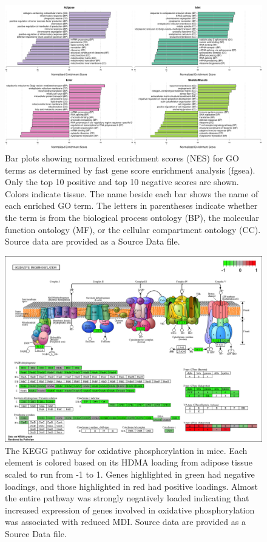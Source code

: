 \documentclass[
]{article}
\begin{document}
\begin{figure}[ht!]
\includegraphics[width=\textwidth]{Figures/Supp_Fig_enrichments_GO.pdf} 
\caption{Bar plots showing normalized enrichment scores (NES) for GO 
terms as determined by fast gene score enrichment analysis (fgsea). 
Only the top 10 positive and top 10 negative scores are shown. Colors 
indicate tissue. The name beside each bar shows the name of each enriched 
GO term. The letters in parentheses indicate whether the term is from the 
biological process ontology (BP), the molecular function ontology (MF), 
or the cellular compartment ontology (CC). Source data are provided as a 
Source Data file.
}
\label{fig:top_enrich_go}
\end{figure}

\begin{figure}[ht!]
\includegraphics[width=\textwidth]{Figures/Supp_Fig_OxPhos.png} 
\caption{The KEGG pathway for oxidative phosphorylation in 
mice. Each element is colored based on its HDMA loading from adipose
tissue scaled to run from -1 to 1. Genes highlighted in green had 
negative loadings, and those highlighted in red had positive loadings. 
Almost the entire pathway was strongly negatively loaded indicating 
that increased expression of genes involved in oxidative phosphorylation
was associated with reduced MDI. Source data are provided as a Source 
Data file.
}
\label{fig:oxPhos}
\end{figure}
\end{document}
